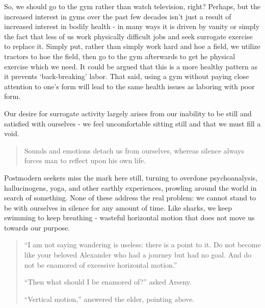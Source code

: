 \documentclass[letterpaper]{article}
\begin{document}
So, we should go to the gym rather than watch television, right? Perhaps, but the increased interest in gyms over the past few decades isn't just a result of increased interest in bodily health - in many ways it is driven by vanity or simply the fact that less of us work physically difficult jobs and seek surrogate exercise to replace it. Simply put, rather than simply work hard and hoe a field, we utilize tractors to hoe the field, then go to the gym afterwards to get he physical exercise which we need. It could be argued that this is a more healthy pattern as it prevents `back-breaking' labor. That said, using a gym without paying close attention to one's form will lead to the same health issues as laboring with poor form.

Our desire for surrogate activity largely arises from our inability to be still and satisfied with ourselves - we feel uncomfortable sitting still and that we must fill a void.

\begin{quote}
  Sounds and emotions detach us from ourselves, whereas silence always forces man to reflect upon his own life.
\end{quote}

Postmodern seekers miss the mark here still, turning to overdone psychoanalysis, hallucinogens, yoga, and other earthly experiences, prowling around the world in search of something. None of these address the real problem: we cannot stand to be with ourselves in silence for any amount of time. Like sharks, we keep swimming to keep breathing - wasteful horizontal motion that does not move us towards our purpose.

\begin{quote}
  ``I am not saying wandering is useless: there is a point to it. Do not become like your beloved Alexander who had a journey but had no goal. And do not be enamored of excessive horizontal motion.''

  ``Then what should I be enamored of?'' asked Arseny.

  ``Vertical motion,'' answered the elder, pointing above.
\end{quote}


\end{document}
